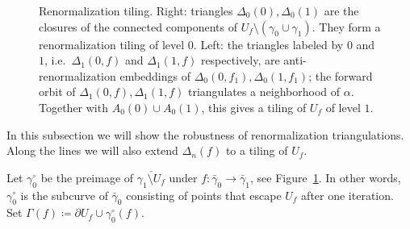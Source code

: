 \documentclass[]{amsart}
\newcommand{\bDelta}{{\mathbb{\Delta}}}
\theoremstyle{remark}
\numberwithin{equation}{section}
\theoremstyle{definition}
\begin{document}
\begin{figure}[t!]
{}
\caption{Renormalization tiling. Right: triangles $\Delta_0(0),\Delta_0(1)$ are the closures of the connected components of $U_f\setminus (\gamma_0\cup \gamma_1)$. They form a renormalization tiling of level $0$. Left: the triangles labeled by $0$ and $1$, i.e.~$\Delta_1(0,f)$ and $\Delta_1(1,f)$ respectively, are anti-renormalization embeddings of $\Delta_0(0,f_1),\Delta_0(1,f_1)$; the forward orbit of $\Delta_1(0,f),\Delta_1(1,f)$ triangulates a neighborhood of $\alpha$. Together with $A_0(0)\cup A_0(1)$, this gives a tiling of $U_f$ of level $1$.} \label{Fig:DfnDelta}
\end{figure}
In this subsection we will show the robustness of renormalization triangulations. Along the lines we will also extend $\bDelta_n(f)$ to a tiling of $U_f$.

Let $\gamma_0^\circ $ be the preimage of $\overline{\gamma_1\setminus U_f}$ under $f\colon \bar \gamma_0\to \bar \gamma_1$, see Figure~\ref{Fig:DfnDelta}. In other words, $\gamma_0^\circ$ is the subcurve of $\bar\gamma_0$ consisting of points that escape $U_f$ after one iteration. Set $\Gamma(f)\coloneqq \partial U_f\cup \gamma_0^\circ (f)$. 
\end{document}
